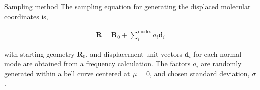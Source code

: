 \documentclass{beamer}
\begin{document}
\begin{frame}{Sampling method}
The sampling equation for generating the displaced molecular coordinates is,

\begin{eqnarray}
\textbf{R} = \textbf{R}_0 + \sum_i^{\textrm{modes}} a_i\textbf{d}_i
\end{eqnarray}

with starting geometry $\textbf{R}_0$, and displacement unit vectors $\textbf{d}_i$ for each normal mode are obtained from a frequency calculation.  The factors $a_i$ are randomly generated within a bell curve centered at $\mu=0$, and chosen standard deviation, $\sigma$. 
\end{frame}
\end{document}
